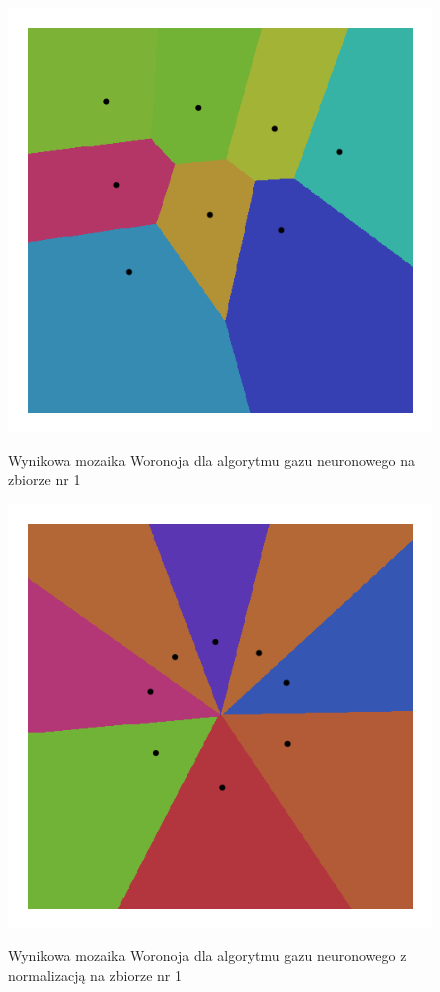 \documentclass{classrep}
\begin{document}
\begin{figure}[h]
	\centering
		\includegraphics[scale=0.55]{pictures/neuralgas_8_neuronow_zbior_0.png}
	\label{fig:neuralgas_8_neuronow_zbior_0}
	\caption{Wynikowa mozaika Woronoja dla algorytmu gazu neuronowego na zbiorze nr 1}
\end{figure}

\begin{figure}[h]
	\centering
		\includegraphics[scale=0.55]{pictures/neuralgas_8_neuronow_zbior_0_normalized.png}
	\label{fig:neuralgas_8_neuronow_zbior_0_normalized}
	\caption{Wynikowa mozaika Woronoja dla algorytmu gazu neuronowego z normalizacją na zbiorze nr 1}
\end{figure}
\end{document}
